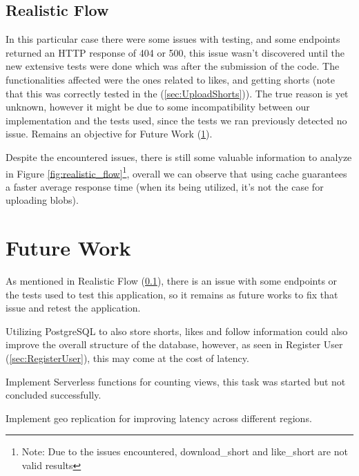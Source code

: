 \documentclass[10pt,a4paper,twocolumn]{article}
\begin{document}
\subsection{Realistic Flow}
\label{sec:realisticFlow}
In this particular case there were some issues with testing, and some endpoints returned an HTTP response of 404 or 500, this issue wasn't discovered until the new extensive tests were done which was after the submission of the code. The functionalities affected were the ones related to likes, and getting shorts (note that this was correctly tested in the (\ref{sec:UploadShorts})). The true reason is yet unknown, however it might be due to some incompatibility between our implementation and the tests used, since the tests we ran previously detected no issue. Remains an objective for Future Work (\ref{sec:FutWork}).
\par Despite the encountered issues, there is still some valuable information to analyze in Figure \ref{fig:realistic_flow}\footnote{Note: Due to the issues encountered, download\_short and like\_short are not valid results}, overall we can observe that using cache guarantees a faster average response time (when its being utilized, it's not the case for uploading blobs).


\section{Future Work}
\label{sec:FutWork}
As mentioned in Realistic Flow (\ref{sec:realisticFlow}), there is an issue with some endpoints or the tests used to test this application, so it remains as future works to fix that issue and retest the application.
\par Utilizing PostgreSQL to also store shorts, likes and follow information could also improve the overall structure of the database, however, as seen in Register User (\ref{sec:RegisterUser}), this may come at the cost of latency.
\par Implement Serverless functions for counting views, this task was started but not concluded successfully.
\par Implement geo replication for improving latency across different regions.
\end{document}
